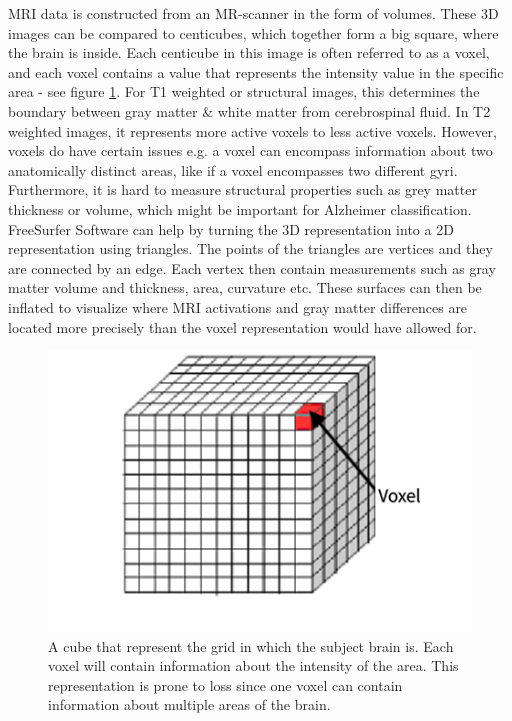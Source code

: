 \documentclass[12pt, fleqn, titlepage]{article}
\begin{document}
MRI data is constructed from an MR-scanner in the form of volumes. These 3D images can be compared to centicubes, which together form a big square, where the brain is inside. Each centicube in this image is often referred to as a voxel, and each voxel contains a value that represents the intensity value in the specific area - see figure \ref{fig:voxel}. For T1 weighted or structural images, this determines the boundary between gray matter \& white matter from cerebrospinal fluid. In T2 weighted images, it represents more active voxels to  less active voxels. However, voxels do have certain issues e.g. a voxel can encompass information about two anatomically distinct areas, like if a voxel encompasses two different gyri. Furthermore, it is hard to measure structural properties such as grey matter thickness or volume, which might be important for Alzheimer classification. FreeSurfer Software can help by turning the 3D representation into a 2D representation using triangles. The points of the triangles are vertices and they are connected by an edge. Each vertex then contain measurements such as gray matter volume and thickness, area, curvature etc. These surfaces can then be inflated to visualize where MRI activations and gray matter differences are located more precisely than the voxel representation would have allowed for. 

\begin{figure}[H]
	\centering
	\includegraphics[width=0.6\linewidth]{imgs/voxel}
	\caption{A cube that represent the grid in which the subject brain is. Each voxel will contain information about the intensity of the area. This representation is prone to loss since one voxel can contain information about multiple areas of the brain.}
	\label{fig:voxel}
\end{figure}
\end{document}
